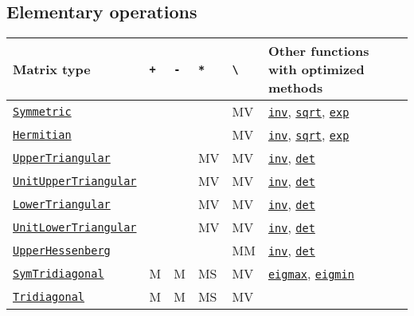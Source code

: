 \hypertarget{17944625623829928397}{}


\subsection{Elementary operations}




\begin{table}[h]

\begin{tabulary}{\linewidth}{|L|L|L|L|L|L|}
\hline
Matrix type & \texttt{+} & \texttt{-} & \texttt{*} & \texttt{{\textbackslash}} & Other functions with optimized methods \\
\hline
\hyperlink{17683454167504168761}{\texttt{Symmetric}} &  &  &  & MV & \hyperlink{13336866048543706848}{\texttt{inv}}, \hyperlink{4551113327515323898}{\texttt{sqrt}}, \hyperlink{5801729597955756107}{\texttt{exp}} \\
\hline
\hyperlink{938713992181310063}{\texttt{Hermitian}} &  &  &  & MV & \hyperlink{13336866048543706848}{\texttt{inv}}, \hyperlink{4551113327515323898}{\texttt{sqrt}}, \hyperlink{5801729597955756107}{\texttt{exp}} \\
\hline
\hyperlink{6344726545165008167}{\texttt{UpperTriangular}} &  &  & MV & MV & \hyperlink{13336866048543706848}{\texttt{inv}}, \hyperlink{16543378577000914469}{\texttt{det}} \\
\hline
\hyperlink{17221720404477798393}{\texttt{UnitUpperTriangular}} &  &  & MV & MV & \hyperlink{13336866048543706848}{\texttt{inv}}, \hyperlink{16543378577000914469}{\texttt{det}} \\
\hline
\hyperlink{15116078732779234709}{\texttt{LowerTriangular}} &  &  & MV & MV & \hyperlink{13336866048543706848}{\texttt{inv}}, \hyperlink{16543378577000914469}{\texttt{det}} \\
\hline
\hyperlink{2163321084999097240}{\texttt{UnitLowerTriangular}} &  &  & MV & MV & \hyperlink{13336866048543706848}{\texttt{inv}}, \hyperlink{16543378577000914469}{\texttt{det}} \\
\hline
\hyperlink{6167777885202579792}{\texttt{UpperHessenberg}} &  &  &  & MM & \hyperlink{13336866048543706848}{\texttt{inv}}, \hyperlink{16543378577000914469}{\texttt{det}} \\
\hline
\hyperlink{6062797780727203318}{\texttt{SymTridiagonal}} & M & M & MS & MV & \hyperlink{1568196261511691624}{\texttt{eigmax}}, \hyperlink{658135215942727363}{\texttt{eigmin}} \\
\hline
\hyperlink{17820886359515748171}{\texttt{Tridiagonal}} & M & M & MS & MV &  \\

\end{tabulary}
\end{table}
